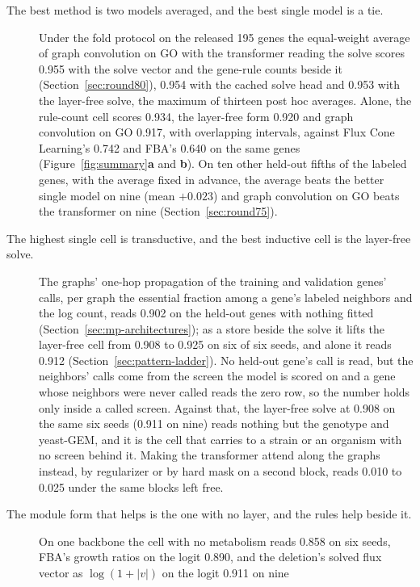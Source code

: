 \begin{description}
  \item[The best method is two models averaged, and the best single model is a tie.]
    Under the fold protocol on the released 195 genes the equal-weight average of graph
    convolution on GO with the transformer reading the solve scores 0.955 with the solve
    vector and the gene-rule counts beside it (Section~\ref{sec:round80}), 0.954 with
    the cached solve head and 0.953 with the layer-free solve, the maximum of thirteen
    post hoc averages. Alone, the rule-count cell scores 0.934, the layer-free form
    0.920 and graph convolution on GO 0.917, with overlapping intervals, against Flux
    Cone Learning's 0.742 and FBA's 0.640 on the same genes
    (Figure~\ref{fig:summary}\textbf{a} and \textbf{b}). On ten other held-out fifths of the labeled
    genes, with the average fixed in advance, the average beats the better single model
    on nine (mean $+0.023$) and graph convolution on GO beats the transformer on nine
    (Section~\ref{sec:round75}).
  \item[The highest single cell is transductive, and the best inductive cell is the
    layer-free solve.] The graphs' one-hop propagation of the training and validation
    genes' calls, per graph the essential fraction among a gene's labeled neighbors and
    the log count, reads 0.902 on the held-out genes with nothing fitted
    (Section~\ref{sec:mp-architectures}); as a store beside the solve it lifts the
    layer-free cell from 0.908 to 0.925 on six of six seeds, and alone it reads 0.912
    (Section~\ref{sec:pattern-ladder}). No held-out gene's call is read, but the
    neighbors' calls come from the screen the model is scored on and a gene whose
    neighbors were never called reads the zero row, so the number holds only inside a
    called screen. Against that, the layer-free solve at 0.908 on the same six seeds
    (0.911 on nine) reads nothing but the genotype and yeast-GEM, and it is the cell
    that carries to a strain or an organism with no screen behind it. Making the
    transformer attend along the graphs instead, by regularizer or by hard mask on a
    second block, reads 0.010 to 0.025 under the same blocks left free.
  \item[The module form that helps is the one with no layer, and the rules help beside
    it.] On one backbone the cell
    with no metabolism reads 0.858 on six seeds, FBA's growth ratios on the logit 0.890,
    and the deletion's solved flux vector as $\log(1 + |v|)$ on the logit 0.911 on nine

\end{description}
